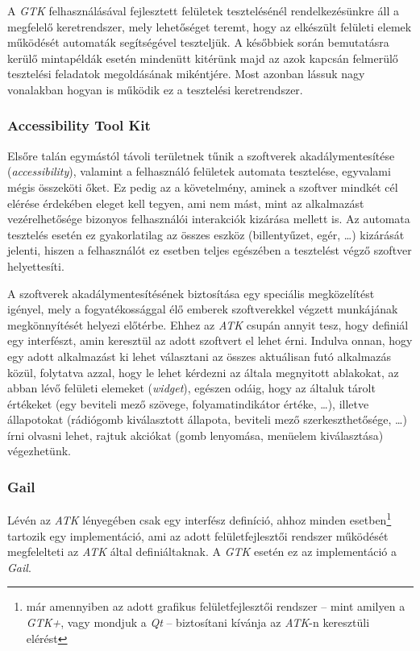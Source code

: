 A \textit{GTK} felhasználásával fejlesztett felületek tesztelésénél rendelkezésünkre áll a megfelelő keretrendszer, mely lehetőséget teremt, hogy az elkészült felületi elemek működését automaták segítségével teszteljük. A későbbiek során bemutatásra kerülő mintapéldák esetén mindenütt kitérünk majd az azok kapcsán felmerülő tesztelési feladatok megoldásának mikéntjére. Most azonban lássuk nagy vonalakban hogyan is működik ez a tesztelési keretrendszer.

\subsubsection{Accessibility Tool Kit}
\label{sec:atk}

Elsőre talán egymástól távoli területnek tűnik a szoftverek akadálymentesítése (\textit{accessibility}), valamint a felhasználó felületek automata tesztelése, egyvalami mégis összeköti őket. Ez pedig az a követelmény, aminek a szoftver mindkét cél elérése érdekében eleget kell tegyen, ami nem mást, mint az alkalmazást vezérelhetősége bizonyos felhasználói interakciók kizárása mellett is. Az automata tesztelés esetén ez gyakorlatilag az összes eszköz (billentyűzet, egér, \dots) kizárását jelenti, hiszen a felhasználót ez esetben teljes egészében a tesztelést végző szoftver helyettesíti.

A szoftverek akadálymentesítésének biztosítása egy speciális megközelítést igényel, mely a fogyatékossággal élő emberek szoftverekkel végzett munkájának megkönnyítését helyezi előtérbe. Ehhez az \textit{ATK} csupán annyit tesz, hogy definiál egy interfészt, amin keresztül az adott szoftvert el lehet érni. Indulva onnan, hogy egy adott alkalmazást ki lehet választani az összes aktuálisan futó alkalmazás közül, folytatva azzal, hogy le lehet kérdezni az általa megnyitott ablakokat, az abban lévő felületi elemeket (\textit{widget}), egészen odáig, hogy az általuk tárolt értékeket (egy beviteli mező szövege, folyamatindikátor értéke, \dots), illetve állapotokat (rádiógomb kiválasztott állapota, beviteli mező szerkeszthetősége, \dots) írni olvasni lehet, rajtuk akciókat (gomb lenyomása, menüelem kiválasztása) végezhetünk.

\subsubsection{Gail}
\label{sec:gail}

Lévén az \textit{ATK} lényegében csak egy interfész definíció, ahhoz minden esetben\footnote{már amennyiben az adott grafikus felületfejlesztői rendszer -- mint amilyen a \textit{GTK+}, vagy mondjuk a \textit{Qt} -- biztosítani kívánja az \textit{ATK}-n keresztüli elérést} tartozik egy implementáció, ami az adott felületfejlesztői rendszer működését megfelelteti az \textit{ATK} által definiáltaknak. A \textit{GTK}  esetén ez az implementáció a \textit{Gail}.

